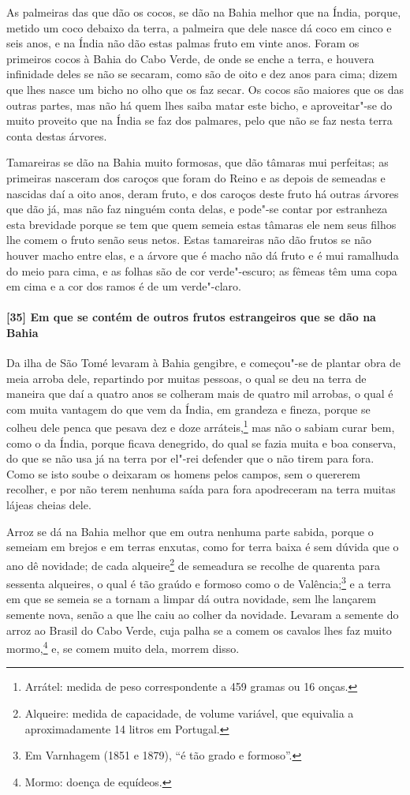 As palmeiras das que dão os cocos, se dão na Bahia melhor que na Índia, porque, metido um
coco debaixo da terra, a palmeira que dele nasce dá coco em cinco e seis anos, e na Índia
não dão estas palmas fruto em vinte anos. Foram os primeiros cocos à Bahia do Cabo Verde,
de onde se enche a terra, e houvera infinidade deles se não se secaram, como são de oito e
dez anos para cima; dizem que lhes nasce um bicho no olho que os faz secar. Os cocos são
maiores que os das outras partes, mas não há quem lhes saiba matar este bicho, e
aproveitar"-se do muito proveito que na Índia se faz dos palmares, pelo que não se faz
nesta terra conta destas árvores.

Tamareiras se dão na Bahia muito formosas, que dão tâmaras mui perfeitas; as primeiras
nasceram dos caroços que foram do Reino e as depois de semeadas e nascidas daí a oito
anos, deram fruto, e dos caroços deste fruto há outras árvores que dão já, mas não faz
ninguém conta delas, e pode"-se contar por estranheza esta brevidade porque se tem que quem
semeia estas tâmaras ele nem seus filhos lhe comem o fruto senão seus netos. Estas
tamareiras não dão frutos se não houver macho entre elas, e a árvore que é macho não dá
fruto e é mui ramalhuda do meio para cima, e as folhas são de cor verde"-escuro; as fêmeas
têm uma copa em cima e a cor dos ramos é de um verde"-claro.

\paragraph{[35] Em que se contém de outros frutos estrangeiros que se dão na Bahia}\quad
Da ilha de São Tomé levaram à Bahia gengibre, e começou"-se de plantar obra de meia arroba
dele, repartindo por muitas pessoas, o qual se deu na terra de maneira que daí a quatro
anos se colheram mais de quatro mil arrobas, o qual é com muita vantagem do que vem da
Índia, em grandeza e fineza, porque se colheu dele penca que pesava dez e doze
arráteis,\footnote{ Arrátel: medida de peso correspondente a 459 gramas ou 16 onças.} mas
não o sabiam curar bem, como o da Índia, porque ficava denegrido, do qual se fazia muita e
boa conserva, do que se não usa já na terra por el"-rei defender que o não tirem para fora.
Como se isto soube o deixaram os homens pelos campos, sem o quererem recolher, e por não
terem nenhuma saída para fora apodreceram na terra muitas lájeas cheias dele.

Arroz se dá na Bahia melhor que em outra nenhuma parte sabida, porque o semeiam em brejos
e em terras enxutas, como for terra baixa é sem dúvida que o ano dê novidade; de cada
alqueire\footnote{ Alqueire: medida de capacidade, de volume variável, que equivalia a
aproximadamente 14 litros em Portugal.} de semeadura se recolhe de quarenta para sessenta
alqueires, o qual é tão graúdo e formoso como o de Valência;\footnote{ Em Varnhagem (1851
e 1879), ``é tão grado e formoso''.} e a terra em que se semeia se a tornam a limpar dá
outra novidade, sem lhe lançarem semente nova, senão a que lhe caiu ao colher da novidade.
Levaram a semente do arroz ao Brasil do Cabo Verde, cuja palha se a comem os cavalos lhes
faz muito mormo,\footnote{ Mormo: doença de equídeos.} e, se comem muito dela, morrem disso.

